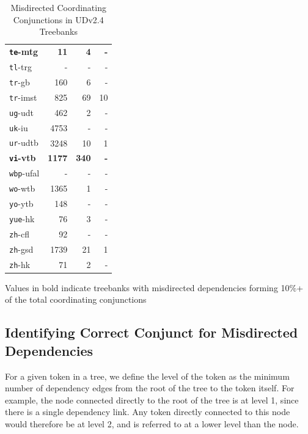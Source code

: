 \begin{table}[H]
{\begin{tabular}{|l|r|r|r|}
\textbf{\texttt{te}-mtg} & \textbf{11} & \textbf{4} & \textbf{-}\\
\texttt{tl}-trg & - & - & -\\
\texttt{tr}-gb & 160 & 6 & -\\
\texttt{tr}-imst & 825 & 69 & 10\\
\texttt{ug}-udt & 462 & 2 & -\\
\texttt{uk}-iu & 4753 & - & -\\
\texttt{ur}-udtb & 3248 & 10 & 1\\
\textbf{\texttt{vi}-vtb} & \textbf{1177} & \textbf{340} & \textbf{-}\\
\texttt{wbp}-ufal & - & - & -\\
\texttt{wo}-wtb & 1365 & 1 & -\\
\texttt{yo}-ytb & 148 & - & -\\
\texttt{yue}-hk & 76 & 3 & -\\
\texttt{zh}-cfl & 92 & - & -\\
\texttt{zh}-gsd & 1739 & 21 & 1\\
\texttt{zh}-hk & 71 & 2 & -\\
\hline
\end{tabular}
}
\caption{Misdirected Coordinating Conjunctions in UDv2.4 Treebanks}
Values in bold indicate treebanks with misdirected dependencies forming 10\%+ of the total coordinating conjunctions
\label{tab:conjunctions_all}
\end{table}


\subsection{Identifying Correct Conjunct for Misdirected Dependencies}
\label{ssec:conjunct-search}

For a given token in a tree, we define the level of the token as the minimum number of dependency edges from the root of the tree to the token itself. For example, the node connected directly to the root of the tree is at level 1, since there is a single dependency link. Any token directly connected to this node would therefore be at level 2, and is referred to at a lower level than the node.

